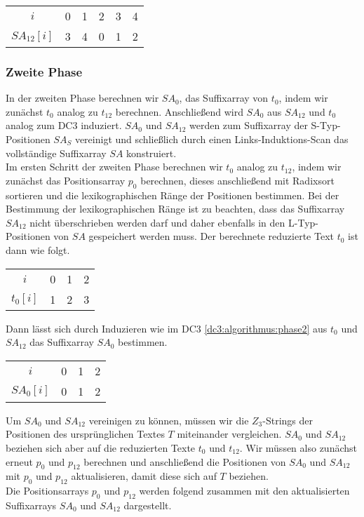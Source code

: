 \begin{table}[H]
	\centering
	\begin{tabular}{c| c c c c c }
		$i$ & 0 & 1 & 2 & 3 & 4 \\
		$SA_{12}[i]$ & 3 & 4 & 0 & 1 & 2 
	\end{tabular}
\end{table}

\subsubsection{Zweite Phase}

In der zweiten Phase berechnen wir $SA_0$, das Suffixarray von $t_0$, indem wir zunächst $t_0$ analog zu $t_{12}$ berechnen. Anschließend wird $SA_0$ aus $SA_{12}$ und $t_0$ analog zum DC3 induziert. $SA_0$ und $SA_{12}$ werden zum Suffixarray der S-Typ-Positionen $SA_S$ vereinigt und schließlich durch einen Links-Induktions-Scan das vollständige Suffixarray $SA$ konstruiert. \\
Im ersten Schritt der zweiten Phase berechnen wir $t_0$ analog zu $t_{12}$, indem wir zunächst das Positionsarray $p_0$ berechnen, dieses anschließend mit Radixsort sortieren und die lexikographischen Ränge der Positionen bestimmen. Bei der Bestimmung der lexikographischen Ränge ist zu beachten, dass das Suffixarray $SA_{12}$ nicht überschrieben werden darf und daher ebenfalls in den L-Typ-Positionen von $SA$ gespeichert werden muss. Der berechnete reduzierte Text $t_0$ ist dann wie folgt.

\begin{table}[H]
	\centering
	\begin{tabular}{c| c c c }
		$i$ & 0 & 1 & 2 \\
		$t_0[i]$ & 1 & 2 & 3 
	\end{tabular}
\end{table}

Dann lässt sich durch Induzieren wie im DC3 \cref{dc3:algorithmus:phase2} aus $t_0$ und $SA_{12}$ das Suffixarray $SA_0$ bestimmen.

\begin{table}[H]
	\centering
	\begin{tabular}{c| c c c }
		$i$ & 0 & 1 & 2 \\
		$SA_0[i]$ & 0 & 1 & 2 
	\end{tabular}
\end{table}

Um $SA_0$ und $SA_{12}$ vereinigen zu können, müssen wir die $Z_3$-Strings der Positionen des ursprünglichen Textes $T$ miteinander vergleichen. $SA_0$ und $SA_{12}$ beziehen sich aber auf die reduzierten Texte $t_0$ und $t_{12}$. Wir müssen also zunächst erneut $p_0$ und $p_{12}$ berechnen und anschließend die Positionen von $SA_0$ und $SA_{12}$ mit $p_0$ und $p_{12}$ aktualisieren, damit diese sich auf $T$ beziehen. \\
Die Positionsarrays $p_0$ und $p_{12}$ werden folgend zusammen mit den aktualisierten Suffixarrays $SA_0$ und $SA_{12}$ dargestellt. 


